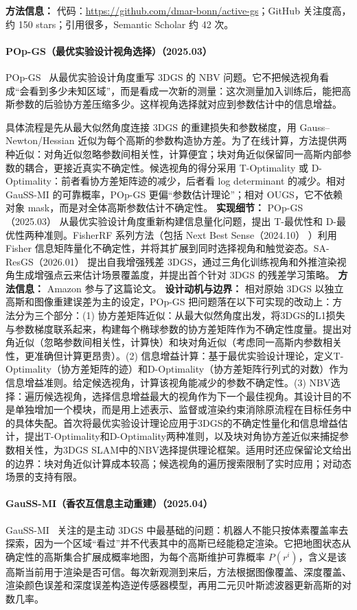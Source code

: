 \textbf{方法信息：} 代码：\url{https://github.com/dmar-bonn/active-gs}；GitHub 关注度高，约 150 stars；引用很多，Semantic Scholar 约 42 次。
\paragraph{POp-GS（最优实验设计视角选择）（2025.03）}
POp-GS~\cite{2503_07819} 从最优实验设计角度重写 3DGS 的 NBV 问题。它不把候选视角看成“会看到多少未知区域”，而是看成一次新的测量：这次测量加入训练后，能把高斯参数的后验协方差压缩多少。这样视角选择就对应到参数估计中的信息增益。

具体流程是先从最大似然角度连接 3DGS 的重建损失和参数梯度，用 Gauss--Newton/Hessian 近似为每个高斯的参数构造协方差。为了在线计算，方法提供两种近似：对角近似忽略参数间相关性，计算便宜；块对角近似保留同一高斯内部参数的耦合，更接近真实不确定性。候选视角的得分采用 T-Optimality 或 D-Optimality：前者看协方差矩阵迹的减少，后者看 log determinant 的减少。相对 GauSS-MI 的可靠概率，POp-GS 更偏“参数估计理论”；相对 OUGS，它不依赖对象 mask，而是对全体高斯参数估计不确定性。
\textbf{实现细节：} POp-GS（2025.03） 从最优实验设计角度重新构建信息量化问题，提出 T-最优性和 D-最优性两种准则。FisherRF 系列方法（包括 Next Best Sense（2024.10） ）利用 Fisher 信息矩阵量化不确定性，并将其扩展到同时选择视角和触觉姿态。SA-ResGS（2026.01） 提出自我增强残差 3DGS，通过三角化训练视角和外推渲染视角生成增强点云来估计场景覆盖度，并提出首个针对 3DGS 的残差学习策略。
\textbf{方法信息：} Amazon 参与了这篇论文。
\textbf{设计动机与边界：} 相对原始 3DGS 以独立高斯和图像重建误差为主的设定，POp-GS 把问题落在以下可实现的改动上：方法分为三个部分：(1) 协方差矩阵近似：从最大似然角度出发，将3DGS的L1损失与参数梯度联系起来，构建每个椭球参数的协方差矩阵作为不确定性度量。提出对角近似（忽略参数间相关性，计算快）和块对角近似（考虑同一高斯内参数相关性，更准确但计算更昂贵）。(2) 信息增益计算：基于最优实验设计理论，定义T-Optimality（协方差矩阵的迹）和D-Optimality（协方差矩阵行列式的对数）作为信息增益准则。给定候选视角，计算该视角能减少的参数不确定性。(3) NBV选择：遍历候选视角，选择信息增益最大的视角作为下一个最佳视角。其设计目的不是单独增加一个模块，而是用上述表示、监督或渲染约束消除原流程在目标任务中的具体失配。首次将最优实验设计理论应用于3DGS的不确定性量化和信息增益估计，提出T-Optimality和D-Optimality两种准则，以及块对角协方差近似来捕捉参数相关性，为3DGS SLAM中的NBV选择提供理论框架。适用时还应保留论文给出的边界：块对角近似计算成本较高；候选视角的遍历搜索限制了实时应用；对动态场景的支持有限。
\paragraph{GauSS-MI（香农互信息主动重建）（2025.04）}
GauSS-MI~\cite{2504_21067} 关注的是主动 3DGS 中最基础的问题：机器人不能只按体素覆盖率去探索，因为一个区域“看过”并不代表其中的高斯已经能稳定渲染。它把地图状态从确定性的高斯集合扩展成概率地图，为每个高斯维护可靠概率 $P(r^i)$，含义是该高斯当前用于渲染是否可信。每次新观测到来后，方法根据图像覆盖、深度覆盖、渲染颜色误差和深度误差构造逆传感器模型，再用二元贝叶斯滤波器更新高斯的对数几率。

